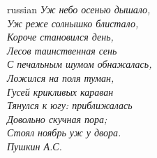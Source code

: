 {
\begin{flushright}
\begin{otherlanguage*}{russian}
\itshape
Уж небо осенью дышало,\\
Уж реже солнышко блистало,\\
Короче становился день,\\
Лесов таинственная сень\\
С печальным шумом обнажалась,\\
Ложился на поля туман,\\
Гусей крикливых караван\\
Тянулся к югу: приближалась\\
Довольно скучная пора;\\
Стоял ноябрь уж у двора.\\
\textit{Пушкин А.С.}
\end{otherlanguage*}
\end{flushright}

}